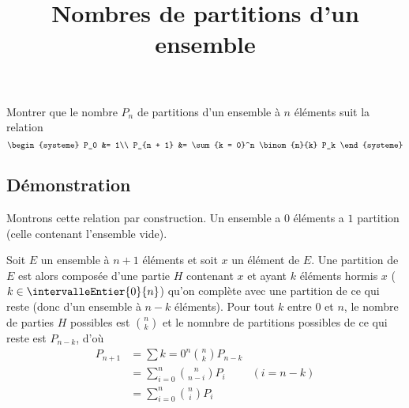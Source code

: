 \documentclass[fontsize=12pt,twoside=false,parskip=half, french]{scrartcl}
\title{Nombres de partitions d’un ensemble}
\date{}
\author{}
\begin{document}
\maketitle
   \begin{Theoreme}
      Montrer que le nombre $P_n$ de partitions d’un ensemble à $n$ éléments suit la relation
      \[
         \begin{systeme}
            P_0       &= 1\\
            P_{n + 1} &= \sum{k = 0}^n \binom{n}{k} P_k
         \end{systeme}
      \]
   \end{Theoreme}
   \subsection{Démonstration}
      Montrons cette relation par construction. Un ensemble a $0$ éléments a $1$ partition
      (celle contenant l’ensemble vide).

      Soit $E$ un ensemble à $n + 1$ éléments et soit $x$ un élément de $E$.
      Une partition de $E$ est alors composée d’une partie $H$
      contenant $x$ et ayant $k$ éléments hormis $x$ ($k \in \intervalleEntier{0}{n}$) qu’on complète avec une partition de ce qui reste (donc d’un ensemble à $n - k$ 
      éléments). Pour tout $k$ entre $0$ et $n$, le nombre de parties $H$ possibles
      est $\binom{n}{k}$ et le nomnbre de partitions possibles de ce qui reste est 
      $P_{n - k}$, d’où
      \begin{align*}
         P_{n + 1} &= \sum{k = 0}^n \binom{n}{k} P_{n - k}\\
                   &= \sum_{i = 0}^n \binom{n}{n - i} P_i & (i = n - k)\\
                   &=  \sum_{i = 0}^n \binom{n}{i} P_i
      \end{align*}      
\end{document}
